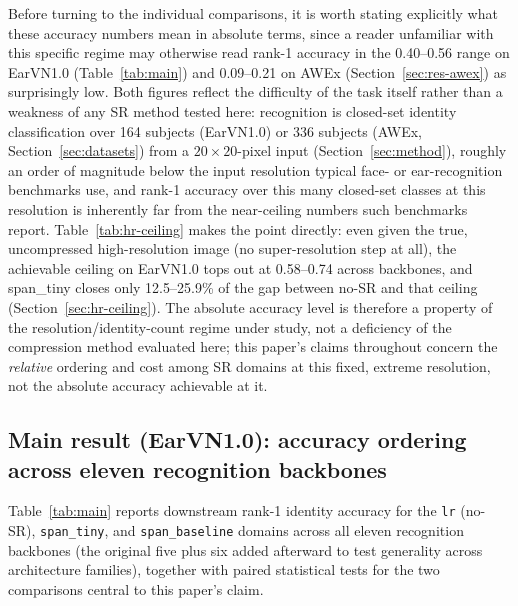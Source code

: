 \documentclass[pdflatex,sn-vancouver-num]{sn-jnl}
\begin{document}
Before turning to the individual comparisons, it is worth stating explicitly what these accuracy numbers mean in absolute terms, since a reader unfamiliar with this specific regime may otherwise read rank-1 accuracy in the 0.40--0.56 range on EarVN1.0 (Table~\ref{tab:main}) and 0.09--0.21 on AWEx (Section~\ref{sec:res-awex}) as surprisingly low. Both figures reflect the difficulty of the task itself rather than a weakness of any SR method tested here: recognition is closed-set identity classification over 164 subjects (EarVN1.0) or 336 subjects (AWEx, Section~\ref{sec:datasets}) from a $20\times20$-pixel input (Section~\ref{sec:method}), roughly an order of magnitude below the input resolution typical face- or ear-recognition benchmarks use, and rank-1 accuracy over this many closed-set classes at this resolution is inherently far from the near-ceiling numbers such benchmarks report. Table~\ref{tab:hr-ceiling} makes the point directly: even given the true, uncompressed high-resolution image (no super-resolution step at all), the achievable ceiling on EarVN1.0 tops out at 0.58--0.74 across backbones, and span\_tiny closes only 12.5--25.9\% of the gap between no-SR and that ceiling (Section~\ref{sec:hr-ceiling}). The absolute accuracy level is therefore a property of the resolution/identity-count regime under study, not a deficiency of the compression method evaluated here; this paper's claims throughout concern the \emph{relative} ordering and cost among SR domains at this fixed, extreme resolution, not the absolute accuracy achievable at it.

\subsection{Main result (EarVN1.0): accuracy ordering across eleven recognition backbones}
\label{sec:res-main}

Table~\ref{tab:main} reports downstream rank-1 identity accuracy for the \texttt{lr} (no-SR), \texttt{span\_tiny}, and \texttt{span\_baseline} domains across all eleven recognition backbones (the original five plus six added afterward to test generality across architecture families), together with paired statistical tests for the two comparisons central to this paper's claim.
\end{document}
